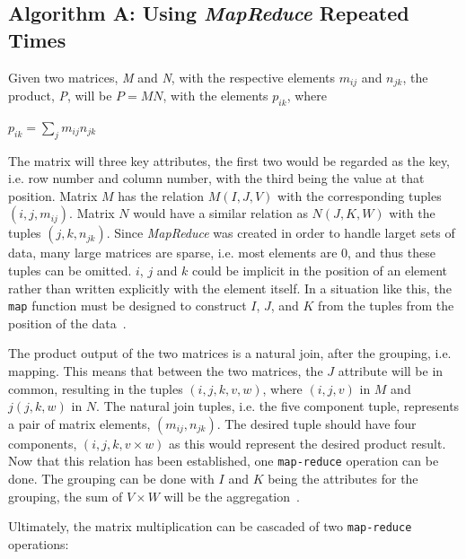 \documentclass[10pt, conference]{IEEEtran}
\def\code#1{\texttt{#1}}
\begin{document}
\subsection{Algorithm A: Using \emph{MapReduce} Repeated Times}
\label{Algorithm A}
Given two matrices, \emph{M} and \emph{N}, with the respective elements $m_{ij}$ and $n_{jk}$, the product, \emph{P}, will be $P=MN$, with the elements $p_{ik}$, where

\begin{center}
$p_{ik} = \sum_{j}^{} m_{ij}n_{jk}
$
\end{center}

The matrix will three key attributes, the first two would be regarded as the key, i.e. row number and column number, with the third being the value at that position. Matrix $M$ has the relation $M(I,J,V)$ with the corresponding tuples $(i,j,m_{ij})$. Matrix $N$ would have a similar relation as $N(J,K,W)$ with the tuples $(j,k,n_{jk})$. Since \emph{MapReduce} was created in order to handle larget sets of data, many large matrices are sparse, i.e. most elements are 0, and thus these tuples can be omitted. $i$, $j$ and $k$ could be implicit in the position of an element rather than written explicitly with the element itself. In a situation like this, the \code{map} function must be designed to construct $I$, $J$, and $K$ from the tuples from the position of the data~\cite{Book}.

The product output of the two matrices is a natural join, after the grouping, i.e. mapping. This means that between the two matrices, the $J$ attribute will be in common, resulting in the tuples $(i,j,k,v,w)$, where $(i,j,v)$ in $M$ and $j(j,k,w)$ in $N$. The natural join tuples, i.e. the five component tuple, represents a pair of matrix elements, $(m_{ij}, n_{jk})$. The desired tuple should have four components, $(i,j,k, v\times w)$ as this would represent the desired product result. Now that this relation has been established, one \code{map-reduce} operation can be done. The grouping can be done with $I$ and $K$ being the attributes for the grouping, the sum of $V \times W$ will be the aggregation~\cite{Book}.

Ultimately, the matrix multiplication can be cascaded of two \code{map-reduce} operations:
\end{document}
